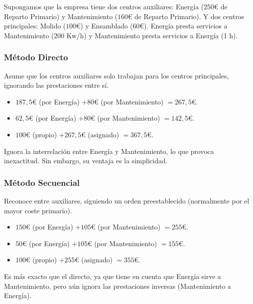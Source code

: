 \begin{ejemplo}
Supongamos que la empresa tiene dos centros auxiliares: Energía ($250 €$ de Reparto Primario) y Mantenimiento ($160 €$ de Reparto Primario). Y dos centros principales: Molido ($100 €$) y Ensamblado ($60 €$). Energía presta servicios a Mantenimiento (200 Kw/h) y Mantenimiento presta servicios a Energía (1 h).

\subsubsection{Método Directo}
Asume que los centros auxiliares solo trabajan para los centros principales, ignorando las prestaciones entre sí.

\begin{itemize}
    \item {} $187,5 €$ (por Energía) $+ 80 €$ (por Mantenimiento) $= 267,5 €$.
    \item {} $62,5 €$ (por Energía) $+ 80 €$ (por Mantenimiento) $= 142,5 €$.
    \item {} $100 €$ (propio) $+ 267,5 €$ (asignado) $= 367,5 €$.
\end{itemize}
 Ignora la interrelación entre Energía y Mantenimiento, lo que provoca inexactitud. Sin embargo, su ventaja es la simplicidad.

\subsubsection{Método Secuencial}
Reconoce  entre auxiliares, siguiendo un orden preestablecido (normalmente por el mayor coste primario).

\begin{itemize}
    \item {} $150 €$ (por Energía) $+ 105 €$ (por Mantenimiento) $= 255 €$.
    \item {} $50 €$ (por Energía) $+ 105 €$ (por Mantenimiento) $= 155 €$.
    \item {} $100 €$ (propio) $+ 255 €$ (asignado) $= 355 €$.
\end{itemize}
 Es más exacto que el directo, ya que tiene en cuenta que Energía sirve a Mantenimiento, pero aún ignora las prestaciones inversas (Mantenimiento a Energía).


\end{ejemplo}
